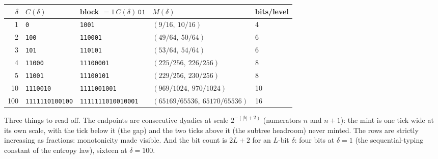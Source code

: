 \documentclass[11pt]{article}
\newcommand{\code}[1]{\texttt{#1}}
\begin{document}
\begin{center}\small
\begin{tabular}{@{}rllll@{}}
\toprule
$\delta$ & $C(\delta)$ & block $= 1\,C(\delta)\,\code{01}$ &
  $M(\delta)$ & bits/level \\
\midrule
1   & \code{0}             & \code{1001}     & $(9/16,\ 10/16)$   & 4 \\
2   & \code{100}           & \code{110001}   & $(49/64,\ 50/64)$  & 6 \\
3   & \code{101}           & \code{110101}   & $(53/64,\ 54/64)$  & 6 \\
4   & \code{11000}         & \code{11100001} & $(225/256,\ 226/256)$ & 8 \\
5   & \code{11001}         & \code{11100101} & $(229/256,\ 230/256)$ & 8 \\
10  & \code{1110010}       & \code{1111001001} & $(969/1024,\ 970/1024)$ & 10 \\
100 & \code{1111110100100} & \code{1111111010010001} &
  $(65169/65536,\ 65170/65536)$ & 16 \\
\bottomrule
\end{tabular}
\end{center}

\noindent Three things to read off. The endpoints are consecutive
dyadics at scale $2^{-(|b|+2)}$ (numerators $n$ and $n{+}1$): the
mint is one tick wide at its own scale, with the tick below it (the
gap) and the two ticks above it (the subtree headroom) never minted.
The rows are strictly increasing as fractions: monotonicity made
visible. And the bit count is $2L + 2$ for an $L$-bit $\delta$: four
bits at $\delta = 1$ (the sequential-typing constant of the entropy
law), sixteen at $\delta = 100$.
\end{document}
